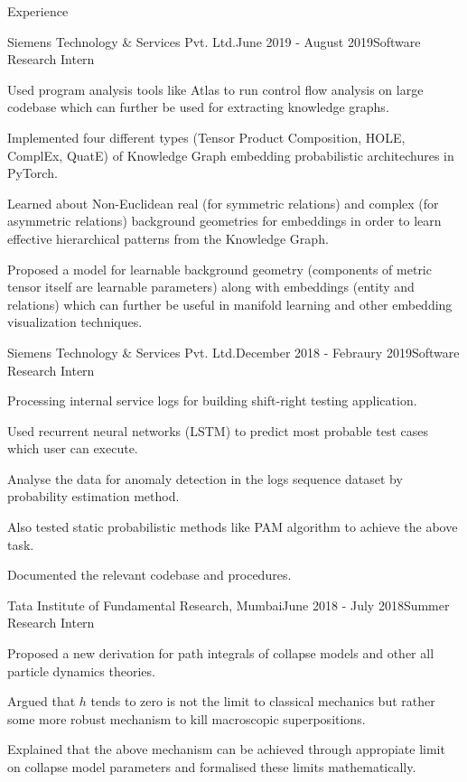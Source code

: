\documentclass{resume} %
\begin{document}
\begin{rSection}{Experience}

\begin{rSubsection}{Siemens Technology \& Services Pvt. Ltd.}{June 2019 - August 2019}{Software Research Intern}{}
\item Used program analysis tools like Atlas to run control flow analysis on large codebase which can further be used for extracting knowledge graphs.
\item Implemented four different types (Tensor Product Composition, HOLE, ComplEx, QuatE) of Knowledge Graph embedding probabilistic architechures in PyTorch.
\item Learned about Non-Euclidean real (for symmetric relations) and complex (for asymmetric relations) background geometries for embeddings in order to learn effective hierarchical patterns from the Knowledge Graph.
\item Proposed a model for learnable background geometry (components of metric tensor itself are learnable parameters) along with embeddings (entity and relations) which can further be useful in manifold learning and other embedding visualization techniques. 
\end{rSubsection}


\begin{rSubsection}{Siemens Technology \& Services Pvt. Ltd.}{December 2018 - Febraury 2019}{Software Research Intern}{}
\item Processing internal service logs for building shift-right testing application.
\item Used recurrent neural networks (LSTM) to predict most probable test cases which user can execute.
\item Analyse the data for anomaly detection in the logs sequence dataset by probability estimation method.
\item Also tested static probabilistic methods like PAM algorithm to achieve the above task. 
\item Documented the relevant codebase and procedures.
\end{rSubsection}

\newpage
\begin{rSubsection}{Tata Institute of Fundamental Research, Mumbai}{June 2018 - July 2018}{Summer Research Intern}{}
\item Proposed a new derivation for path integrals of collapse models and other all particle dynamics theories.
\item Argued that $h$ tends to zero is not the limit to classical mechanics but rather some more robust mechanism to kill macroscopic superpositions.
\item Explained that the above mechanism can be achieved through appropiate limit on collapse model parameters and formalised these limits mathematically.
\end{rSubsection}

\end{rSection}
\end{document}
